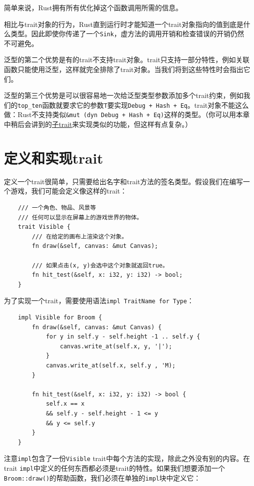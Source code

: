 简单来说，Rust拥有所有优化掉这个函数调用所需的信息。

相比与trait对象的行为，Rust直到运行时才能知道一个trait对象指向的值到底是什么类型。因此即使你传递了一个\texttt{Sink}，虚方法的调用开销和检查错误的开销仍然不可避免。

泛型的第二个优势是有的trait不支持trait对象。trait只支持一部分特性，例如关联函数只能使用泛型，这样就完全排除了trait对象。当我们将到这些特性时会指出它们。

泛型的第三个优势是可以很容易地一次给泛型类型参数添加多个trait约束，例如我们的\texttt{top\_ten}函数就要求它的参数\texttt{T}要实现\texttt{Debug + Hash + Eq}。trait对象不能这么做：Rust不支持类似\texttt{\&mut (dyn Debug + Hash + Eq)}这样的类型。（你可以用本章中稍后会讲到的\hyperref[subtrait]{子trait}来实现类似的功能，但这样有点复杂。）

\section{定义和实现trait}

定义一个trait很简单，只需要给出名字和trait方法的签名类型。假设我们在编写一个游戏，我们可能会定义像这样的trait：
\begin{verbatim}
    /// 一个角色、物品、风景等
    /// 任何可以显示在屏幕上的游戏世界的物体。
    trait Visible {
        /// 在给定的画布上渲染这个对象。
        fn draw(&self, canvas: &mut Canvas);

        /// 如果点击(x, y)会选中这个对象就返回true。
        fn hit_test(&self, x: i32, y: i32) -> bool;
    }
\end{verbatim}

为了实现一个trait，需要使用语法\texttt{impl TraitName for Type}：
\begin{verbatim}
    impl Visible for Broom {
        fn draw(&self, canvas: &mut Canvas) {
            for y in self.y - self.height -1 .. self.y {
                canvas.write_at(self.x, y, '|');
            }
            canvas.write_at(self.x, self.y , 'M);
        }

        fn hit_test(&self, x: i32, y: i32) -> bool {
            self.x == x
            && self.y - self.height - 1 <= y
            && y <= self.y
        }
    }
\end{verbatim}

注意\texttt{impl}包含了一份\texttt{Visible} trait中每个方法的实现，除此之外没有别的内容。在trait \texttt{impl}中定义的任何东西都必须是trait的特性。如果我们想要添加一个\texttt{Broom::draw()}的帮助函数，我们必须在单独的\texttt{impl}块中定义它：

